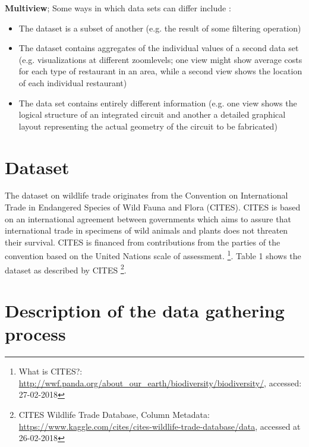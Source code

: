 \textbf{Multiview}; Some ways in which data sets can differ include \cite{Baldonado2000}:
\begin{itemize}
\item The dataset is a subset of another (e.g. the result of some filtering operation)
\item The dataset contains aggregates of the individual values of a second data set (e.g.  visualizations at different zoomlevels; one view might show average costs for each type of restaurant in an area, while a second view shows the location of each individual restaurant)
\item The data set contains entirely different information (e.g. one view shows the logical structure of an integrated circuit and another a detailed graphical layout representing the actual geometry of the circuit to be fabricated)
\end{itemize}
\fi %


\section{Dataset}
The dataset on wildlife trade originates from the Convention on International Trade in Endangered Species of Wild Fauna and Flora (CITES). CITES is based on an international agreement between governments which aims to assure that international trade in specimens of wild animals and plants does not threaten their survival. CITES is financed from contributions from the parties of the convention based on the United Nations scale of assessment. \footnote {What is CITES?: \url{http://wwf.panda.org/about_our_earth/biodiversity/biodiversity/}, accessed: 27-02-2018}. Table 1 shows the dataset as described by CITES \footnote{CITES Wildlife Trade Database, Column Metadata: \url{https://www.kaggle.com/cites/cites-wildlife-trade-database/data}, accessed at 26-02-2018}.



\section{Description of the data gathering process}


